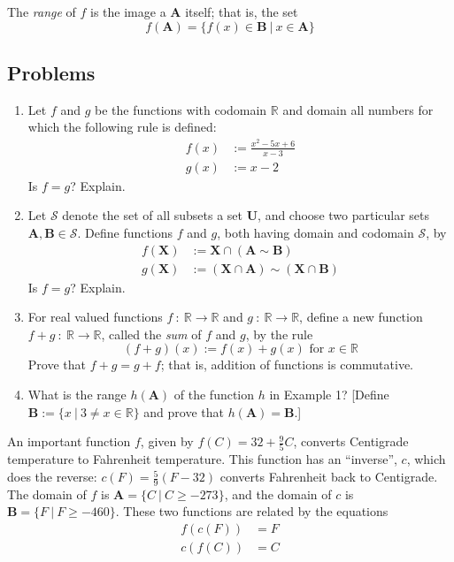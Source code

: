 \documentclass{article}
\newcommand\Sc{\mathcal S}
\newcommand\A{\mathbf A}
\newcommand\B{\mathbf B}
\newcommand\U{\mathbf U}
\newcommand\X{\mathbf X}
\newcommand{\0}{\mathbf 0}
\newcommand{\1}{\mathbf 1}
\newcommand\R{\mathbb R}
\begin{document}
The \emph{range} of $f$ is the image a $\A$ itself; that is, the set
\begin{equation*}
f(\A) = \{ f(x) \in \B\ |\ x \in \A \}
\end{equation*}


\subsection*{Problems}

\begin{enumerate}
  \item Let $f$ and $g$ be the functions with codomain $\R$ and domain all numbers for which the following rule is defined:
    \begin{align*}
    f(x) & := \frac{x^2-5x+6}{x-3} \\
    g(x) & := x-2
    \end{align*}
    Is $f=g$? Explain.

  \item Let $\Sc$ denote the set of all subsets a set $\U$, and choose two particular sets $\A,\B \in \Sc$. Define functions $f$ and $g$, both having domain and codomain $\Sc$, by
    \begin{align*}
    f(\X) & := \X \cap (\A \sim \B) \\ 
    g(\X) & := (\X \cap \A) \sim (\X \cap \B)
    \end{align*}
    Is $f=g$? Explain.

  \item For real valued functions $f\ :\ \R \to \R$ and $g\ :\ \R \to \R$, define a new function $f+g\ :\ \R \to \R$, called the \emph{sum} of $f$ and $g$, by the rule
    \begin{equation*}
    (f+g)(x) := f(x) + g(x) \text{ for } x \in \R
    \end{equation*}
    Prove that $f+g = g+f$; that is, addition of functions is commutative.

  \item What is the range $h(\A)$ of the function $h$ in Example 1? [Define $\B := \{ x\ |\ 3 \neq x \in \R \}$ and prove that $h(\A) = \B$.]
\end{enumerate}

An important function $f$, given by $f(C) = 32 + \frac{9}{5} C$, converts Centigrade temperature to Fahrenheit temperature. This function has an ``inverse'', $c$, which does the reverse: $c(F) = \frac{5}{9} (F-32)$ converts Fahrenheit back to Centigrade. The domain of $f$ is $\A = \{ C\ |\ C \geq -273 \}$, and the domain of $c$ is $\B = \{ F\ |\ F \geq -460 \}$. These two functions are related by the equations
\begin{align*}
f(c(F)) & = F \\
c(f(C)) & = C
\end{align*}
\end{document}
